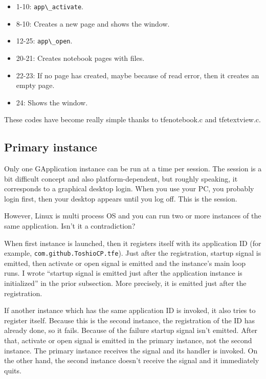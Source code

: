 \begin{itemize}
\tightlist
\item
  1-10: \passthrough{\lstinline!app\_activate!}.
\item
  8-10: Creates a new page and shows the window.
\item
  12-25: \passthrough{\lstinline!app\_open!}.
\item
  20-21: Creates notebook pages with files.
\item
  22-23: If no page has created, maybe because of read error, then it
  creates an empty page.
\item
  24: Shows the window.
\end{itemize}

These codes have become really simple thanks to tfenotebook.c and
tfetextview.c.

\hypertarget{primary-instance}{%
\subsection{Primary instance}\label{primary-instance}}

Only one GApplication instance can be run at a time per session. The
session is a bit difficult concept and also platform-dependent, but
roughly speaking, it corresponds to a graphical desktop login. When you
use your PC, you probably login first, then your desktop appears until
you log off. This is the session.

However, Linux is multi process OS and you can run two or more instances
of the same application. Isn't it a contradiction?

When first instance is launched, then it registers itself with its
application ID (for example,
\passthrough{\lstinline!com.github.ToshioCP.tfe!}). Just after the
registration, startup signal is emitted, then activate or open signal is
emitted and the instance's main loop runs. I wrote ``startup signal is
emitted just after the application instance is initialized'' in the
prior subsection. More precisely, it is emitted just after the
registration.

If another instance which has the same application ID is invoked, it
also tries to register itself. Because this is the second instance, the
registration of the ID has already done, so it fails. Because of the
failure startup signal isn't emitted. After that, activate or open
signal is emitted in the primary instance, not the second instance. The
primary instance receives the signal and its handler is invoked. On the
other hand, the second instance doesn't receive the signal and it
immediately quits.

